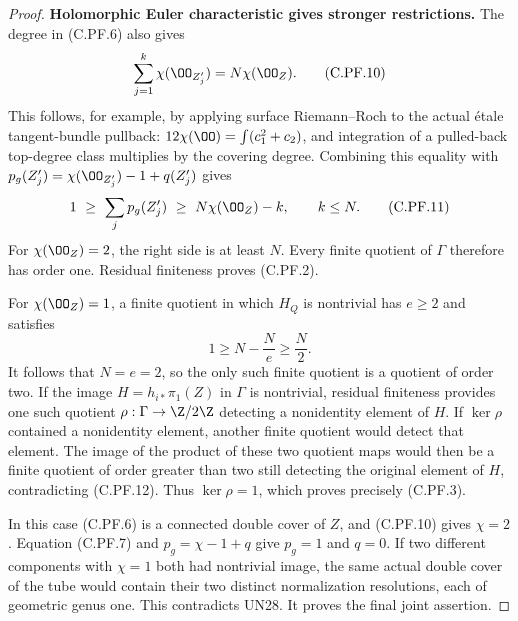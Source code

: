 \begin{proof}
\par\medskip\noindent\textbf{Holomorphic Euler characteristic gives stronger restrictions.}
The degree in (C.PF.6) also gives
\[
       \sum_{j=1}^k\chi(\OO_{Z_j'})=N\chi(\OO_Z).
                                                        \tag{C.PF.10}
\]
This follows, for example, by applying surface Riemann--Roch to
the actual \'{e}tale tangent-bundle pullback:
$12\chi(\OO)=\int(c_1^2+c_2)$, and integration of a pulled-back
top-degree class multiplies by the covering degree. Combining
this equality with
$p_g(Z_j')=\chi(\OO_{Z_j'})-1+q(Z_j')$ gives
\[
       1\ \ge\ \sum_j p_g(Z_j')
           \ \ge\ N\chi(\OO_Z)-k,\qquad k\le N .
                                                        \tag{C.PF.11}
\]
For $\chi(\OO_Z)=2$, the right side is at least $N$.
Every finite quotient of $\Gamma$ therefore has order one.
Residual finiteness proves (C.PF.2).

For $\chi(\OO_Z)=1$, a finite quotient in which $H_Q$ is
nontrivial has $e\ge2$ and satisfies
\[
                    1\ge N-\frac Ne\ge\frac N2 .
                                                        \tag{C.PF.12}
\]
It follows that $N=e=2$, so the only such finite quotient
is a quotient of order two. If the image
$H=h_{i*}\pi_1(Z)$ in $\Gamma$ is nontrivial, residual
finiteness provides one such quotient
$\rho:\Gamma\to\Z/2\Z$ detecting a nonidentity element of $H$.
If $\ker\rho$ contained a nonidentity element, another finite
quotient would detect that element. The image of the product
of these two quotient maps would then be a finite quotient
of order greater than two still detecting the original
element of $H$, contradicting (C.PF.12). Thus $\ker\rho=1$,
which proves precisely (C.PF.3).

In this case (C.PF.6) is a connected double cover of $Z$,
and (C.PF.10) gives $\chi=2$. Equation (C.PF.7) and
$p_g=\chi-1+q$ give $p_g=1$ and $q=0$. If two different
components with $\chi=1$ both had nontrivial image, the
same actual double cover of the tube would contain their
two distinct normalization resolutions, each of geometric
genus one. This contradicts UN28. It proves the final
joint assertion.
\end{proof}
